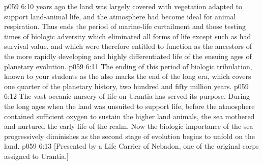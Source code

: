 \pc \vs p059 6:10  years ago the land was largely covered with vegetation adapted to support land\hyp{}animal life, and the atmosphere had become ideal for animal respiration. Thus ends the period of marine\hyp{}life curtailment and those testing times of biologic adversity which eliminated all forms of life except such as had survival value, and which were therefore entitled to function as the ancestors of the more rapidly developing and highly differentiated life of the ensuing ages of planetary evolution.
\vs p059 6:11 The ending of this period of biologic tribulation, known to your students as the  also marks the end of the long  era, which covers one quarter of the planetary history, two hundred and fifty million years.
\vs p059 6:12 The vast oceanic nursery of life on Urantia has served its purpose. During the long ages when the land was unsuited to support life, before the atmosphere contained sufficient oxygen to sustain the higher land animals, the sea mothered and nurtured the early life of the realm. Now the biologic importance of the sea progressively diminishes as the second stage of evolution begins to unfold on the land.
\vsetoff
\vs p059 6:13 [Presented by a Life Carrier of Nebadon, one of the original corps assigned to Urantia.]

